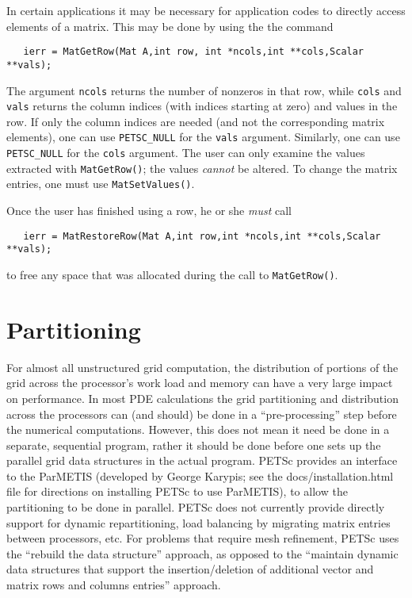 In certain applications it may be necessary for application codes
to directly access elements of a matrix. This may be done by using the 
the command 
\begin{verbatim}
   ierr = MatGetRow(Mat A,int row, int *ncols,int **cols,Scalar **vals);
\end{verbatim}
The argument {\tt ncols} returns the number of nonzeros in that row, 
while {\tt cols} and {\tt vals} returns the column indices (with indices
starting at zero) and values in the row. If only the column 
indices are needed (and not the corresponding matrix elements), one
can use {\tt PETSC\_NULL} for the {\tt vals} argument. Similarly,
one can use {\tt PETSC\_NULL} for the {\tt cols} argument.
The user can only examine the values extracted with {\tt MatGetRow()};
the values {\em cannot} be altered. 
 
To change the matrix entries, one must use {\tt MatSetValues()}.

Once the user has finished using a row, he or she {\em must} call 
\begin{verbatim}
   ierr = MatRestoreRow(Mat A,int row,int *ncols,int **cols,Scalar **vals);
\end{verbatim}
to free any space that was allocated during the call to {\tt MatGetRow()}.

\section{Partitioning}
\label{sec:partitioning}  

For almost all unstructured grid computation, the distribution of portions of 
the grid across the processor's work load and memory can have a very large
impact on performance. In most PDE calculations the grid partitioning and 
distribution across the processors can (and should) be done in a ``pre-processing'' step
before the numerical computations. However, this does not mean it need be done
in a separate, sequential program, rather it should be done before one sets up the 
parallel grid data structures in the actual program. PETSc provides an interface to
the ParMETIS (developed by George Karypis; see the docs/installation.html file
for directions on installing PETSc to use ParMETIS), to allow the partitioning to be done in
parallel. PETSc does not currently provide directly support for dynamic
repartitioning, load balancing by migrating matrix entries between processors, etc.
For problems that require mesh refinement, PETSc uses the ``rebuild the data structure''
approach, as opposed to the ``maintain dynamic data structures that support the 
insertion/deletion of additional vector and matrix rows and columns entries'' approach.

